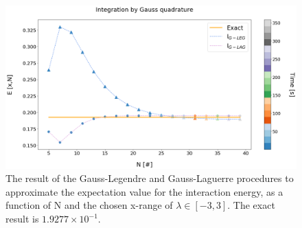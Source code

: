 \documentclass[%
reprint,
amsmath,amssymb,
aps,
]{revtex4-1}
\begin{document}
\begin{figure}[!ht]
	\includegraphics[scale = 0.4]{Gauss_lagleg_2.png}
	\caption{\label{integrated_results} The result of the Gauss-Legendre and Gauss-Laguerre procedures to approximate the expectation value for the interaction energy, as a function of N and the chosen x-range of $\lambda \in[-3,3]$. The exact result is $1.9277\times 10^{-1}$. \vspace{2cm}}
\end{figure}
\end{document}
